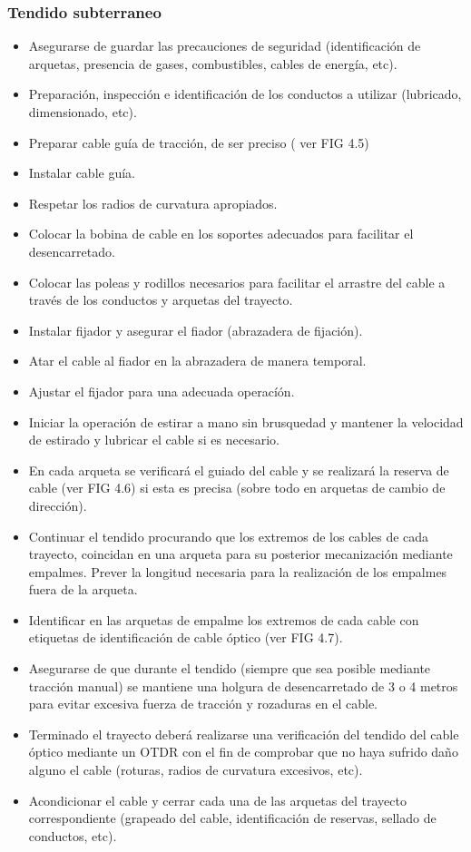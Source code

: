 \documentclass[12pt,letterpaper]{article}
\begin{document}
\subsubsection{Tendido subterraneo}
\begin{itemize}
    \item Asegurarse de guardar las precauciones de seguridad (identificación de arquetas, presencia de gases, combustibles, cables de energía, etc).
    \item Preparación, inspección e identificación de los conductos a utilizar (lubricado, dimensionado, etc).
    \item Preparar cable guía de tracción, de ser preciso ( ver FIG 4.5)
    \item Instalar cable guía.
    \item Respetar los radios de curvatura apropiados.
    \item Colocar la bobina de cable en los soportes adecuados para facilitar el desencarretado.
    \item Colocar las poleas y rodillos necesarios para facilitar el arrastre del cable a través de los conductos y arquetas del trayecto.
    \item Instalar fijador y asegurar el fiador (abrazadera de fijación).
    \item Atar el cable al fiador en la abrazadera de manera temporal.
    \item Ajustar el fijador para una adecuada operacíón.
    \item Iniciar la operación de estirar a mano sin brusquedad y mantener la velocidad de estirado y lubricar el cable si es necesario.
    \item En cada arqueta se verificará el guiado del cable y se realizará la reserva de cable (ver FIG 4.6) si esta es precisa (sobre todo en arquetas de cambio de dirección).
    \item Continuar el tendido procurando que los extremos de los cables de cada trayecto, coincidan en una arqueta para su posterior mecanización mediante empalmes. Prever la longitud necesaria para la realización de los empalmes fuera de la arqueta.
    \item Identificar en las arquetas de empalme los extremos de cada cable con etiquetas de identificación de cable óptico (ver FIG 4.7).
    \item Asegurarse de que durante el tendido (siempre que sea posible mediante tracción manual) se mantiene una holgura de desencarretado de 3 o 4 metros para evitar excesiva fuerza de tracción y rozaduras en el cable.
    \item Terminado el trayecto deberá realizarse una verificación del tendido del cable óptico mediante un OTDR con el fin de comprobar que no haya sufrido daño alguno el cable (roturas, radios de curvatura excesivos, etc).
    \item Acondicionar el cable y cerrar cada una de las arquetas del trayecto correspondiente (grapeado del cable, identificación de reservas, sellado de conductos, etc).
\end{itemize}
\end{document}
